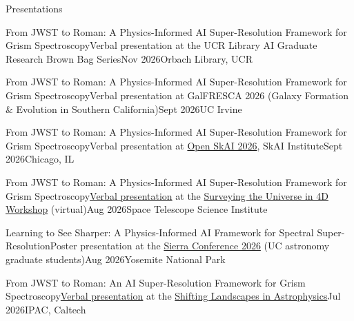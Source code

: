 \documentclass[]{kyvernitis-resume}
\begin{document}
\begin{section}{Presentations}

\begin{subsectionnobullet}{From JWST to Roman: A Physics-Informed AI Super-Resolution Framework for Grism Spectroscopy}{Verbal presentation at the UCR Library AI Graduate Research Brown Bag Series}{Nov 2026}{Orbach Library, UCR}
\end{subsectionnobullet}

\begin{subsectionnobullet}{From JWST to Roman: A Physics-Informed AI Super-Resolution Framework for Grism Spectroscopy}{Verbal presentation at GalFRESCA 2026 (Galaxy Formation \& Evolution in Southern California)}{Sept 2026}{UC Irvine}
\end{subsectionnobullet}

\begin{subsectionnobullet}{From JWST to Roman: A Physics-Informed AI Super-Resolution Framework for Grism Spectroscopy}{Verbal presentation at \href{https://www.openskai-conference.org/}{Open SkAI 2026}, SkAI Institute}{Sept 2026}{Chicago, IL}
\end{subsectionnobullet}

\begin{subsectionnobullet}{From JWST to Roman: A Physics-Informed AI Super-Resolution Framework for Grism Spectroscopy}{\href{https://www.youtube.com/watch?v=z102gWq6Fo8\&t=2400s}{Verbal presentation} at the \href{https://www.stsci.edu/contents/events/stsci/2026/august/surveying-the-universe-in-4d-beating-cosmic-variance-with-wide-field-slitless-spectroscopy-from-hst}{Surveying the Universe in 4D Workshop} (virtual)}{Aug 2026}{Space Telescope Science Institute}
\end{subsectionnobullet}

\begin{subsectionnobullet}{Learning to See Sharper: A Physics-Informed AI Framework for Spectral Super-Resolution}{Poster presentation at the \href{https://sierra.physics.ucla.edu/}{Sierra Conference 2026} (UC astronomy graduate students)}{Aug 2026}{Yosemite National Park}
\end{subsectionnobullet}

\begin{subsectionnobullet}{From JWST to Roman: An AI Super-Resolution Framework for Grism Spectroscopy}{\href{https://www.youtube.com/watch?v=55EDsSILBbY}{Verbal presentation} at the \href{https://workshop.ipac.caltech.edu/roman2026/}{Shifting Landscapes in Astrophysics}}{Jul 2026}{IPAC, Caltech}
\end{subsectionnobullet}


\end{section}
\end{document}
